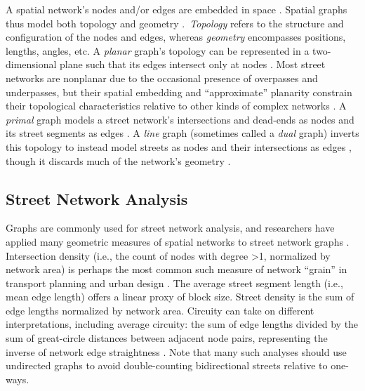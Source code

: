 \documentclass[12pt,letterpaper]{article} %
\begin{document}
A spatial network's nodes and/or edges are embedded in space \citep{barthelemy_spatial_2022}. Spatial graphs thus model both topology and geometry \citep{fischer_spatial_2014}.\ \textit{Topology} refers to the structure and configuration of the nodes and edges, whereas \textit{geometry} encompasses positions, lengths, angles, etc. A \textit{planar} graph's topology can be represented in a two-dimensional plane such that its edges intersect only at nodes \citep{barthelemy_modeling_2008}. Most street networks are nonplanar due to the occasional presence of overpasses and underpasses, but their spatial embedding and \enquote{approximate} planarity constrain their topological characteristics relative to other kinds of complex networks \citep{boeing_planarity_2020}. A \textit{primal} graph models a street network's intersections and dead-ends as nodes and its street segments as edges \citep{porta_network_2006-1}. A \textit{line} graph (sometimes called a \textit{dual} graph) inverts this topology to instead model streets as nodes and their intersections as edges \citep{porta_network_2006}, though it discards much of the network's geometry \citep{ratti_space_2004}.

\subsection{Street Network Analysis}

Graphs are commonly used for street network analysis, and researchers have applied many geometric measures of spatial networks to street network graphs \citep{barthelemy_spatial_2011}. Intersection density (i.e., the count of nodes with degree >1, normalized by network area) is perhaps the most common such measure of network \enquote{grain} in transport planning and urban design \citep[e.g.,][]{ewing_travel_2010}. The average street segment length (i.e., mean edge length) offers a linear proxy of block size. Street density is the sum of edge lengths normalized by network area. Circuity can take on different interpretations, including average circuity: the sum of edge lengths divided by the sum of great-circle distances between adjacent node pairs, representing the inverse of network edge straightness \citep{boeing_urban_2019}. Note that many such analyses should use undirected graphs to avoid double-counting bidirectional streets relative to one-ways.
\end{document}
